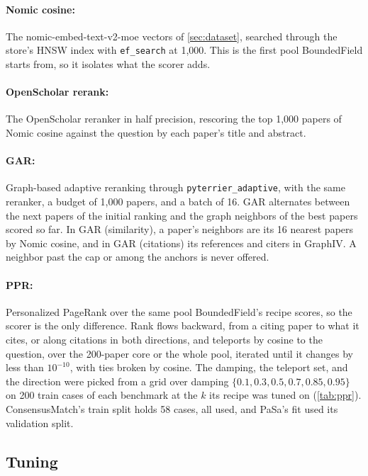 \paragraph{Nomic cosine:}
The nomic-embed-text-v2-moe vectors of \cref{sec:dataset}, searched through the store's HNSW index with \texttt{ef\_search} at 1,000. This is the first pool BoundedField starts from, so it isolates what the scorer adds.

\paragraph{OpenScholar rerank:}
The OpenScholar reranker \citep{asai2024openscholar} in half precision, rescoring the top 1,000 papers of Nomic cosine against the question by each paper's title and abstract.

\paragraph{GAR:}
Graph-based adaptive reranking \citep{macavaney2022gar} through \texttt{pyterrier\_adaptive}, with the same reranker, a budget of 1,000 papers, and a batch of 16. GAR alternates between the next papers of the initial ranking and the graph neighbors of the best papers scored so far. In GAR (similarity), a paper's neighbors are its 16 nearest papers by Nomic cosine, and in GAR (citations) its references and citers in GraphIV. A neighbor past the cap or among the anchors is never offered.

\paragraph{PPR:}
Personalized PageRank \citep{page1999pagerank} over the same pool BoundedField's  recipe scores, so the scorer is the only difference. Rank flows backward, from a citing paper to what it cites, or along citations in both directions, and teleports by cosine to the question, over the 200-paper core or the whole pool, iterated until it changes by less than $10^{-10}$, with ties broken by cosine. The damping, the teleport set, and the direction were picked from a grid over damping $\{0.1, 0.3, 0.5, 0.7, 0.85, 0.95\}$ on 200 train cases of each benchmark at the $k$ its recipe was tuned on (\cref{tab:ppr}). ConsensusMatch's train split holds 58 cases, all used, and PaSa's fit used its validation split.

\FloatBarrier
\subsection{Tuning}
\label{app:tuning}

